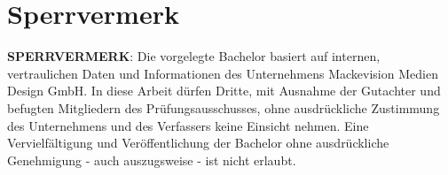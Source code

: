 \chapter*{Sperrvermerk}
\thispagestyle{plain}

\textbf{SPERRVERMERK}: Die vorgelegte Bachelor basiert auf 
internen, vertraulichen Daten und Informationen des Unternehmens 
Mackevision Medien Design GmbH. In diese Arbeit dürfen Dritte, mit 
Ausnahme der Gutachter und befugten Mitgliedern des 
Prüfungsausschusses, ohne ausdrückliche Zustimmung des Unternehmens 
und des Verfassers keine Einsicht nehmen. Eine Vervielfältigung und 
Veröffentlichung der Bachelor ohne ausdrückliche 
Genehmigung - auch auszugsweise - ist nicht erlaubt.